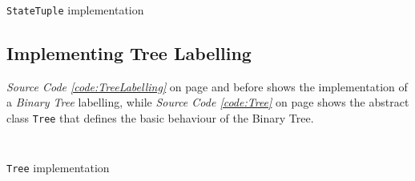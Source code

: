 \documentclass[a4paper,12pt,twoside]{scrreprt}
\begin{document}
\begin{listing}[ht]
    \inputminted[fontsize=\footnotesize,linenos,breaklines,breakanywhere]{java}{./code/statemonad/StateTuple.java}
    \caption[\texttt{StateTuple} implementation]{\texttt{StateTuple} implementation}
    \label{code:StateTuple}
\end{listing}
\clearpage

\subsection{Implementing Tree Labelling}
\textit{Source Code \ref{code:TreeLabelling}} on page \pageref{code:TreeLabelling} and before shows the implementation of a \textit{Binary Tree} labelling, while \textit{Source Code \ref{code:Tree}} on page \pageref{code:Tree} shows the abstract class  \texttt{Tree} that defines the basic behaviour of the Binary Tree.

\inputminted[fontsize=\footnotesize,linenos,breaklines,breakanywhere]{java}{./code/statemonad/Labelling.java}

\begin{listing}[ht]
    \inputminted[fontsize=\footnotesize,linenos,breaklines,breakanywhere]{java}{./code/statemonad/Tree.java}
    \caption[\texttt{Tree} implementation]{\texttt{Tree} implementation}
    \label{code:Tree}
\end{listing}

\clearpage
{}
{}
\printbibliography
\end{document}
